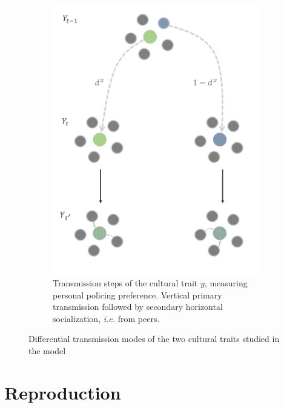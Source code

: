 \documentclass[a4paper]{article}
\begin{document}
\begin{figure}[!htbp]
\begin{subfigure}{.5\textwidth}
		\includegraphics[width=.9\linewidth]{yTransmission.pdf}
		\caption{Transmission steps of the cultural trait $y$, measuring personal policing preference. Vertical primary transmission followed by secondary horizontal socialization, \textit{i.e.} from peers.}
		\label{fig:ytrans}
	\end{subfigure}
	\caption{Differential transmission modes of the two cultural traits studied in the model}
	\label{fig:cultrans}
\end{figure} 

\section{Reproduction}
\label{sec:repro}
\end{document}
